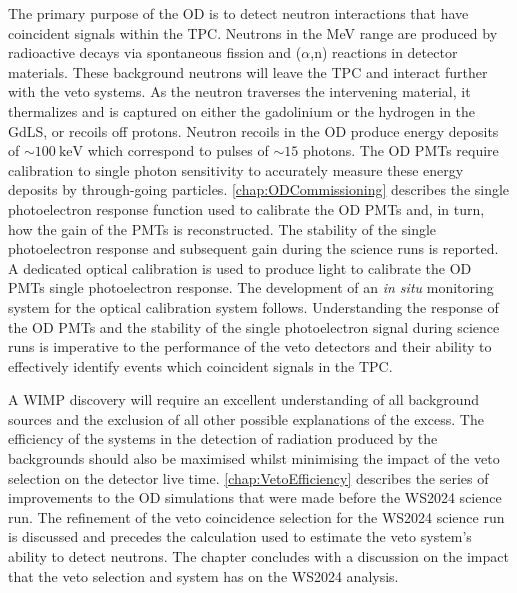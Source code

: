 The primary purpose of the OD is to detect neutron interactions that have coincident signals within the TPC. Neutrons in the MeV range are produced by radioactive decays via spontaneous fission and ($\alpha$,n) reactions in detector materials. These background neutrons will leave the TPC and interact further with the veto systems. As the neutron traverses the intervening material, it thermalizes and is captured on either the gadolinium or the hydrogen in the GdLS, or recoils off protons. Neutron recoils in the OD produce energy deposits of $\sim100~\text{keV}$ which correspond to pulses of $\sim15$ photons. The OD PMTs require calibration to single photon sensitivity to accurately measure these energy deposits by through-going particles. \autoref{chap:ODCommissioning} describes the single photoelectron response function used to calibrate the OD PMTs and, in turn, how the gain of the PMTs is reconstructed. The stability of the single photoelectron response and subsequent gain during the science runs is reported. A dedicated optical calibration is used to produce light to calibrate the OD PMTs single photoelectron response. The development of an \textit{in situ} monitoring system for the optical calibration system follows. Understanding the response of the OD PMTs and the stability of the single photoelectron signal during science runs is imperative to the performance of the veto detectors and their ability to effectively identify events which coincident signals in the TPC.

A WIMP discovery will require an excellent understanding of all background sources and the exclusion of all other possible explanations of the excess. The efficiency of the systems in the detection of radiation produced by the backgrounds should also be maximised whilst minimising the impact of the veto selection on the detector live time. \autoref{chap:VetoEfficiency} describes the series of improvements to the OD simulations that were made before the WS2024 science run. The refinement of the veto coincidence selection for the WS2024 science run is discussed and precedes the calculation used to estimate the veto system's ability to detect neutrons. The chapter concludes with a discussion on the impact that the veto selection and system has on the WS2024 analysis. 

